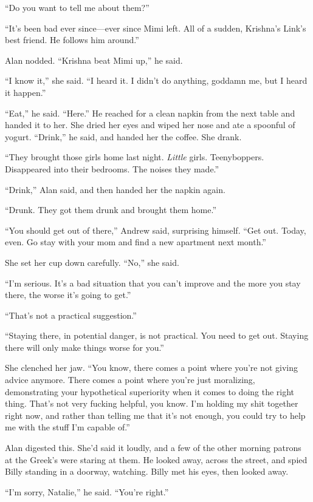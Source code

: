 ``Do you want to tell me about them?''

``It's been bad ever since---ever since Mimi left.  All of a sudden,
Krishna's Link's best friend.  He follows him around.''

Alan nodded.  ``Krishna beat Mimi up,'' he said. 

``I know it,'' she said.  ``I heard it.  I didn't do anything, goddamn
me, but I heard it happen.''

``Eat,'' he said.  ``Here.'' He reached for a clean napkin from the
next table and handed it to her.  She dried her eyes and wiped her
nose and ate a spoonful of yogurt.  ``Drink,'' he said, and handed her
the coffee.  She drank.

``They brought those girls home last night.  \textit{Little} girls. 
Teenyboppers.  Disappeared into their bedrooms.  The noises they
made.''

``Drink,'' Alan said, and then handed her the napkin again.

``Drunk.  They got them drunk and brought them home.''

``You should get out of there,'' Andrew said, surprising himself. 
``Get out.  Today, even.  Go stay with your mom and find a new
apartment next month.''

She set her cup down carefully.  ``No,'' she said.

``I'm serious.  It's a bad situation that you can't improve and the
more you stay there, the worse it's going to get.''

``That's not a practical suggestion.''

``Staying there, in potential danger, is not practical.  You need to
get out.  Staying there will only make things worse for you.''

She clenched her jaw.  ``You know, there comes a point where you're
not giving advice anymore.  There comes a point where you're just
moralizing, demonstrating your hypothetical superiority when it comes
to doing the right thing.  That's not very fucking helpful, you know. 
I'm holding my shit together right now, and rather than telling me
that it's not enough, you could try to help me with the stuff I'm
capable of.''

Alan digested this.  She'd said it loudly, and a few of the other
morning patrons at the Greek's were staring at them.  He looked away,
across the street, and spied Billy standing in a doorway, watching. 
Billy met his eyes, then looked away.

``I'm sorry, Natalie,'' he said.  ``You're right.''

